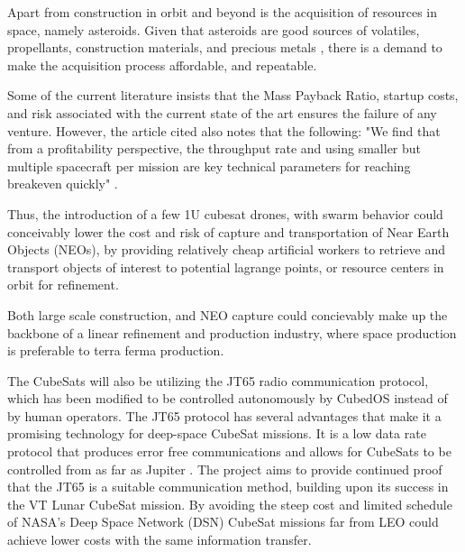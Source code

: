 Apart from construction in orbit and beyond is the acquisition of
resources in space, namely asteroids. Given that asteroids are good
sources of volatiles, propellants, construction materials, and
precious metals \cite{Ross:2020}, there is a demand to make the
acquisition process affordable, and repeatable.

Some of the current literature insists that the Mass Payback Ratio,
startup costs, and risk associated with the current state of the art
ensures the failure of any venture. However, the article
cited also notes that the following: "We find that from a
profitability perspective, the throughput rate and using smaller but
multiple spacecraft per mission are key technical parameters for
reaching breakeven quickly" \cite{Vardy:2018}.

Thus, the introduction of a few 1U cubesat drones, with swarm behavior
could conceivably lower the cost and risk of capture and
transportation of Near Earth Objects (NEOs), by providing relatively
cheap artificial workers to retrieve and transport objects of interest
to potential lagrange points, or resource centers in orbit for
refinement.

Both large scale construction, and NEO capture could concievably make
up the backbone of a linear refinement and production industry, where
space production is preferable to terra ferma production.

The CubeSats will also be utilizing the JT65 radio communication
protocol, which has been modified to be controlled autonomously by
CubedOS instead of by human operators. The JT65 protocol has several
advantages that make it a promising technology for deep-space CubeSat
missions. It is a low data rate protocol that produces error free
communications and allows for CubeSats to be controlled from as far as
Jupiter \cite{brandon:2019}. The project aims to provide continued
proof that the JT65 is a suitable communication method, building upon
its success in the VT Lunar CubeSat mission. By avoiding the steep
cost and limited schedule of NASA’s Deep Space Network (DSN) CubeSat
missions far from LEO could achieve lower costs with the same
information transfer.
